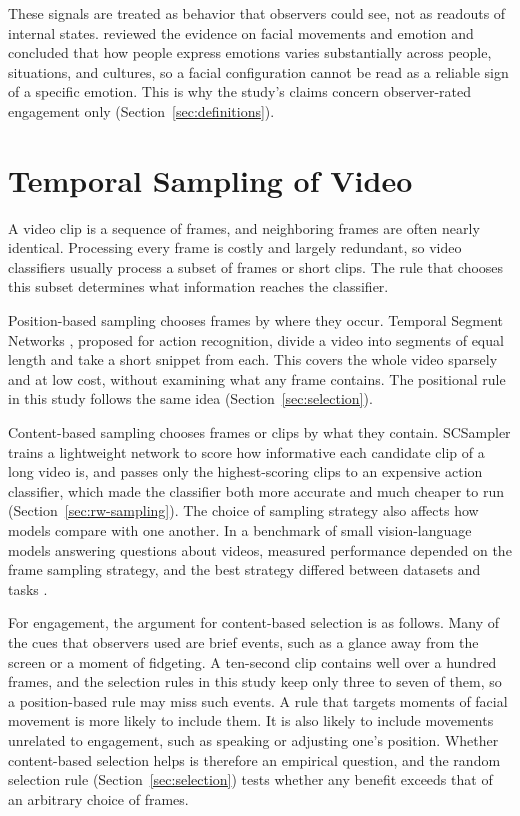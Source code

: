 These signals are treated as behavior that observers could see, not as readouts of internal states.  reviewed the evidence on facial movements and emotion and concluded that how people express emotions varies substantially across people, situations, and cultures, so a facial configuration cannot be read as a reliable sign of a specific emotion. This is why the study's claims concern observer-rated engagement only (Section~\ref{sec:definitions}).



\section{Temporal Sampling of Video}
\label{sec:sampling}

A video clip is a sequence of frames, and neighboring frames are often nearly identical. Processing every frame is costly and largely redundant, so video classifiers usually process a subset of frames or short clips. The rule that chooses this subset determines what information reaches the classifier.

Position-based sampling chooses frames by where they occur. Temporal Segment Networks \cite{wang2016}, proposed for action recognition, divide a video into segments of equal length and take a short snippet from each. This covers the whole video sparsely and at low cost, without examining what any frame contains. The positional rule in this study follows the same idea (Section~\ref{sec:selection}).

Content-based sampling chooses frames or clips by what they contain. SCSampler \cite{korbar2019} trains a lightweight network to score how informative each candidate clip of a long video is, and passes only the highest-scoring clips to an expensive action classifier, which made the classifier both more accurate and much cheaper to run (Section~\ref{sec:rw-sampling}). The choice of sampling strategy also affects how models compare with one another. In a benchmark of small vision-language models answering questions about videos, measured performance depended on the frame sampling strategy, and the best strategy differed between datasets and tasks \cite{brkic2025}.

For engagement, the argument for content-based selection is as follows. Many of the cues that observers used are brief events, such as a glance away from the screen or a moment of fidgeting. A ten-second clip contains well over a hundred frames, and the selection rules in this study keep only three to seven of them, so a position-based rule may miss such events. A rule that targets moments of facial movement is more likely to include them. It is also likely to include movements unrelated to engagement, such as speaking or adjusting one's position. Whether content-based selection helps is therefore an empirical question, and the random selection rule (Section~\ref{sec:selection}) tests whether any benefit exceeds that of an arbitrary choice of frames.


